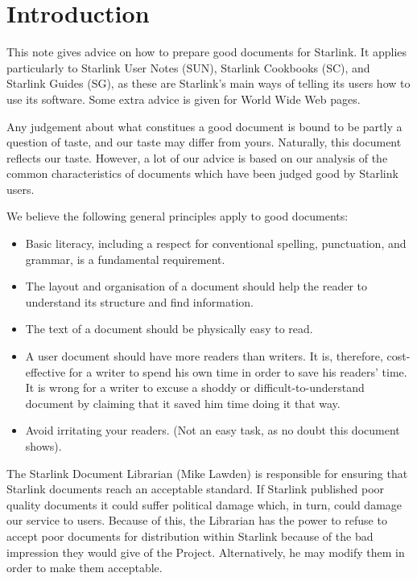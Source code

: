 \documentclass[twoside,11pt,nolof]{starlink}
\begin{document}
\scfrontmatter

\section{Introduction}

This note gives advice on how to prepare good documents for Starlink.
It applies particularly to Starlink User Notes (SUN), Starlink Cookbooks (SC),
and Starlink Guides (SG), as these are Starlink's main ways of telling its users
how to use its software.
Some extra advice is given for World Wide Web pages.

Any judgement about what constitues a good document is bound to be partly a
question of taste, and our taste may differ from yours.
Naturally, this document reflects our taste.
However, a lot of our advice is based on our analysis of the common
characteristics of documents which have been judged good by Starlink users.

We believe the following general principles apply to good documents:

\begin{itemize}
\item Basic literacy, including a respect for conventional spelling,
punctuation, and grammar, is a fundamental requirement.
\item The layout and organisation of a document should help the reader to
understand its structure and find information.
\item The text of a document should be physically easy to read.
\item A user document should have more readers than writers.
It is, therefore, cost-effective for a writer to spend his own time in order
to save his readers' time.
It is wrong for a writer to excuse a shoddy or difficult-to-understand document
by claiming that it saved him time doing it that way.
\item Avoid irritating your readers.
(Not an easy task, as no doubt this document shows).
\end{itemize}

The Starlink Document Librarian (Mike Lawden) is responsible for ensuring that
Starlink documents reach an acceptable standard.
If Starlink published poor quality documents it could suffer political damage
which, in turn, could damage our service to users.
Because of this, the Librarian has the power to refuse to accept poor
documents for distribution within Starlink because of the bad impression they
would give of the Project.
Alternatively, he may modify them in order to make them acceptable.
\end{document}
